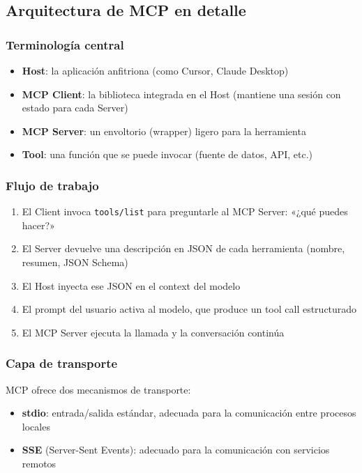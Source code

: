 \subsection{Arquitectura de MCP en detalle}

\subsubsection{Terminología central}

\begin{itemize}
    \item \textbf{Host}: la aplicación anfitriona (como Cursor, Claude Desktop)
    \item \textbf{MCP Client}: la biblioteca integrada en el Host (mantiene una sesión con estado para cada Server)
    \item \textbf{MCP Server}: un envoltorio (wrapper) ligero para la herramienta
    \item \textbf{Tool}: una función que se puede invocar (fuente de datos, API, etc.)
\end{itemize}

\subsubsection{Flujo de trabajo}

\begin{enumerate}
    \item El Client invoca \texttt{tools/list} para preguntarle al MCP Server: «¿qué puedes hacer?»
    \item El Server devuelve una descripción en JSON de cada herramienta (nombre, resumen, JSON Schema)
    \item El Host inyecta ese JSON en el context del modelo
    \item El prompt del usuario activa al modelo, que produce un tool call estructurado
    \item El MCP Server ejecuta la llamada y la conversación continúa
\end{enumerate}

\subsubsection{Capa de transporte}

MCP ofrece dos mecanismos de transporte:
\begin{itemize}
    \item \textbf{stdio}: entrada/salida estándar, adecuada para la comunicación entre procesos locales
    \item \textbf{SSE} (Server-Sent Events): adecuado para la comunicación con servicios remotos
\end{itemize}

